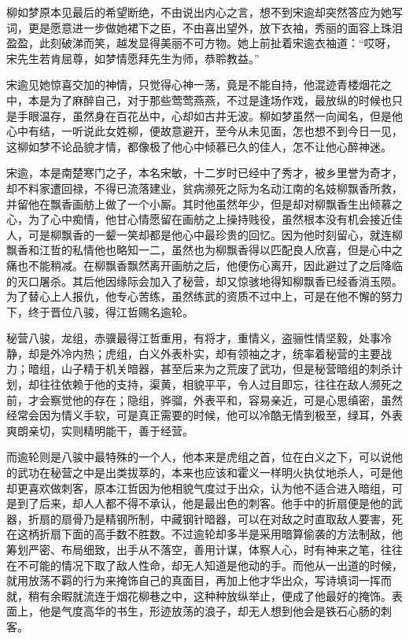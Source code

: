 柳如梦原本见最后的希望断绝，不由说出内心之言，想不到宋逾却突然答应为她写词，更是愿意进一步做她裙下之臣，不由喜出望外，放下衣袖，秀丽的面容上珠泪盈盈，此刻破涕而笑，越发显得美丽不可方物。她上前扯着宋逾衣袖道：“哎呀，宋先生若肯屈尊，如梦情愿拜先生为师，恭聆教益。”

宋逾见她惊喜交加的神情，只觉得心神一荡，竟是不能自持，他混迹青楼烟花之中，本是为了麻醉自己，对于那些莺莺燕燕，不过是逢场作戏，最放纵的时候也只是手眼温存，虽然身在百花丛中，心却如古井无波。柳如梦虽然一向闻名，但是他心中有结，一听说此女姓柳，便故意避开，至今从未见面，怎也想不到今日一见，这柳如梦不论品貌才情，都像极了他心中倾慕已久的佳人，怎不让他心醉神迷。

宋逾，本是南楚寒门之子，本名宋敏，十二岁时已经中了秀才，被乡里誉为奇才，却不料家遭回禄，不得已流落建业，贫病濒死之际为名动江南的名妓柳飘香所救，并留他在飘香画舫上做了一个小厮。其时他虽然年少，但是却对柳飘香生出倾慕之心，为了心中痴情，他甘心情愿留在画舫之上操持贱役，虽然根本没有机会接近佳人，可是柳飘香的一颦一笑却都是他心中最珍贵的回忆。因为他时刻留心，就连柳飘香和江哲的私情他也略知一二，虽然也为柳飘香得以匹配良人欣喜，但是心中之痛也不能稍减。在柳飘香飘然离开画舫之后，他便伤心离开，因此避过了之后降临的灭口屠杀。其后他因缘际会加入了秘营，却又惊骇地得知柳飘香已经香消玉陨。为了替心上人报仇，他专心苦练，虽然练武的资质不过中上，可是在他不懈的努力下，终于晋位八骏，得江哲赐名逾轮。

秘营八骏，龙组，赤骥最得江哲重用，有将才，重情义，盗骊性情坚毅，处事冷静，却是外冷内热；虎组，白义外表朴实，却有领袖之才，统率着秘营的主要战力；暗组，山子精于机关暗器，甚至后来为之荒废了武功，但是秘营暗组的刺杀计划，却往往依赖于他的支持，渠黄，相貌平平，令人过目即忘，往往在敌人濒死之前，才会察觉他的存在；隐组，骅骝，外表平和，容易亲近，可是心思缜密，虽然经常会因为情义手软，可是真正需要的时候，他可以冷酷无情到极至，绿耳，外表爽朗亲切，实则精明能干，善于经营。

而逾轮则是八骏中最特殊的一个人，他本来是虎组之首，位在白义之下，可以说他的武功在秘营之中是出类拔萃的，本来也应该和霍义一样明火执仗地杀人，可是他却更喜欢做刺客，原本江哲因为他相貌气度过于出众，认为他不适合进入暗组，可是到了后来，却人人都不得不承认，他是最出色的刺客。他手中的折扇便是他的武器，折扇的扇骨乃是精钢所制，中藏钢针暗器，可以在对敌之时直取敌人要害，死在这柄折扇下面的高手数不胜数。不过逾轮却多半是采用暗算偷袭的方法制敌，他筹划严密、布局细致，出手从不落空，善用计谋，体察人心，时有神来之笔，往往在不可能的情况下取了敌人性命，却无人知道是他动的手。而他从一出道的时候，就用放荡不羁的行为来掩饰自己的真面目，再加上他才华出众，写诗填词一挥而就，稍有余暇就流连于烟花柳巷之中，这种种放纵举止，便成了他最好的掩饰。表面上，他是气度高华的书生，形迹放荡的浪子，却无人想到他会是铁石心肠的刺客。

